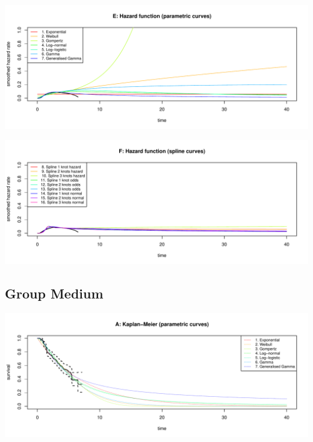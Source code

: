 \documentclass[
]{article}
\begin{document}
\begin{flushleft}\includegraphics[height=0.29\textheight]{Images/validate_extrapolation1-5} \end{flushleft}

\begin{flushleft}\includegraphics[height=0.29\textheight]{Images/validate_extrapolation1-6} \end{flushleft}

\newpage

\hypertarget{group-medium}{%
\subsection{Group Medium}\label{group-medium}}

\begin{flushleft}\includegraphics[height=0.29\textheight]{Images/validate_extrapolation2-1} \end{flushleft}
\end{document}
